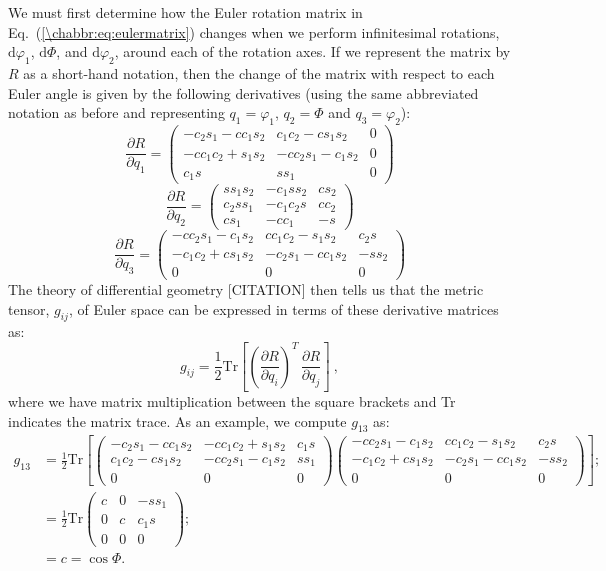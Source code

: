We must first determine how the Euler rotation matrix in Eq.~(\ref{\chabbr:eq:eulermatrix}) changes when we perform infinitesimal rotations, $\mathrm{d}\varphi_1$, $\mathrm{d}\Phi$, and $\mathrm{d}\varphi_2$,  around each of the rotation axes. If we represent the matrix by $R$ as a short-hand notation, then the change of the matrix with respect to each Euler angle is given by the following derivatives (using the same abbreviated notation as before and representing $q_1=\varphi_1$, $q_2=\Phi$ and $q_3=\varphi_2$):
\[
	\frac{\partial R}{\partial q_1} = \begin{pmatrix}-c_2s_1-cc_1s_2&c_1c_2-cs_1s_2& 0\\
	-cc_1c_2+s_1s_2&-cc_2s_1-c_1s_2&0\\
	c_1s & ss_1 & 0\end{pmatrix}
\]
\[
	\frac{\partial R}{\partial q_2} = \begin{pmatrix}ss_1s_2&-c_1ss_2&cs_2\\
	c_2ss_1 & -c_1c_2s &cc_2\\
	cs_1&-cc_1&-s\end{pmatrix}
\]
\[
	\frac{\partial R}{\partial q_3} = \begin{pmatrix}-cc_2s_1-c_1s_2&cc_1c_2-s_1s_2&c_2s\\
	-c_1c_2+cs_1s_2&-c_2s_1-cc_1s_2&-ss_2\\
	0&0&0\end{pmatrix}
\]
The theory of differential geometry [CITATION] then tells us that the metric tensor, $g_{ij}$, of Euler space can be expressed in terms of these derivative matrices as:
\[
	g_{ij} = \frac{1}{2}\text{Tr}\left[ \left(\frac{\partial R}{\partial q_i}\right)^T\,\frac{\partial R}{\partial q_j}\right]\ ,
\]
where we have matrix multiplication between the square brackets and Tr indicates the matrix trace.  As an example, we compute $g_{13}$ as:
{\small\begin{equation*}
\begin{split}
	g_{13} &= \frac{1}{2} \text{Tr}\left[ \begin{pmatrix}
	-c_2s_1-cc_1s_2&-cc_1c_2+s_1s_2&c_1s \\
	c_1c_2-cs_1s_2&-cc_2s_1-c_1s_2&ss_1\\
	 0& 0 & 0\end{pmatrix}\begin{pmatrix}-cc_2s_1-c_1s_2&cc_1c_2-s_1s_2&c_2s\\
	-c_1c_2+cs_1s_2&-c_2s_1-cc_1s_2&-ss_2\\
	0&0&0\end{pmatrix}\right];\\
	&= \frac{1}{2} \text{Tr}\begin{pmatrix}c&0&-ss_1\\ 0& c& c_1s\\ 0&0&0\end{pmatrix};\\
	&= c = \cos\Phi.
\end{split}
\end{equation*}}
